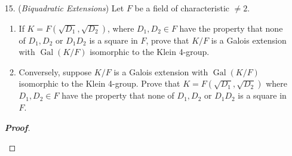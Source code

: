 \documentclass[12pt,leqno]{article}
\theoremstyle{definition}
\newcommand{\Gal}{\operatorname{Gal}}
\newcommand{\Q}{\mathbb{Q}}
\newenvironment{Proof}{\begin{proof}[\textnormal{\textbf{Proof}}]}{\end{proof}}
\begin{document}
\begin{enumerate}
\begin{Proof}
     Observe that $\sqrt{2}=\sqrt{2+\sqrt{2}}^2-2$, hence $\sqrt{2}\in\Q(\sqrt{2+\sqrt{2}})$. Further, \[\left(2+\sqrt{2}\right)\left(2-\sqrt{2}\right)=2\] hence \[\sqrt{2-\sqrt{2}}=\frac{\sqrt{2}}{\sqrt{2+\sqrt{2}}}\] so $\sqrt{2-\sqrt{2}}$ is also an element of $\Q(\sqrt{2+\sqrt{2}}$. Let $\phi$ denote the automorphism which takes $\sqrt{2+\sqrt{2}}$ to $\sqrt{2-\sqrt{2}}$. We see that \[\phi(\sqrt{2})=\phi\left(\sqrt{2+\sqrt{2}}^2-2\right)=\phi\left(\sqrt{2+\sqrt{2}}\right)^2-2=2-\sqrt{2}-2=-\sqrt{2}\]  hence we can evaluate powers of $\phi$:\begin{align*}\phi^2\left(\sqrt{2+\sqrt{2}}\right)&=\phi\left(\sqrt{2-\sqrt{2}}\right)\\&=\phi\left(\frac{\sqrt{2}}{\sqrt{2+\sqrt{2}}}\right)\\&=\frac{-\sqrt{2}}{\sqrt{2-\sqrt{2}}}\\&=-\sqrt{2+\sqrt{2}}\end{align*} Similarly \begin{align*}\phi^3\left(\sqrt{2+\sqrt{2}}\right)&=\phi\left(-\sqrt{2+\sqrt{2}}\right)=-\sqrt{2-\sqrt{2}}\\\phi^4\left(\sqrt{2+\sqrt{2}}\right)&=\phi\left(-\sqrt{2-\sqrt{2}}\right)=\sqrt{2+\sqrt{2}}\end{align*} Thus the Galois group is exactly $\{\phi,\phi^2,\phi^3,\phi^4=\text{Id}\}$, hence $\Q(\sqrt{2+\sqrt{2}})$ is a cyclic quartic field.
    \end{Proof}
   \item [15.] (\textit{Biquadratic Extensions}) Let $F$ be a field of characteristic $\not=2$.
    \begin{enumerate}
     \item If $K=F(\sqrt{D_1},\sqrt{D_2})$, where $D_1,D_2\in F$ have the property that none of $D_1,D_2$ or $D_1D_2$ is a square in $F$, prove that $K/F$ is a Galois extension with $\Gal(K/F)$ isomorphic to the Klein 4-group.
     \item Conversely, suppose $K/F$ is a Galois extension with $\Gal(K/F)$ isomorphic to the Klein 4-group. Prove that $K=F(\sqrt{D_1},\sqrt{D_2})$ where $D_1,D_2\in F$ have the property that none of $D_1,D_2$ or $D_1D_2$ is a square in $F$.
    \end{enumerate}
    \begin{Proof}\indent
     \begin{enumerate}

\end{enumerate}
\end{Proof}
\end{enumerate}
\end{document}
